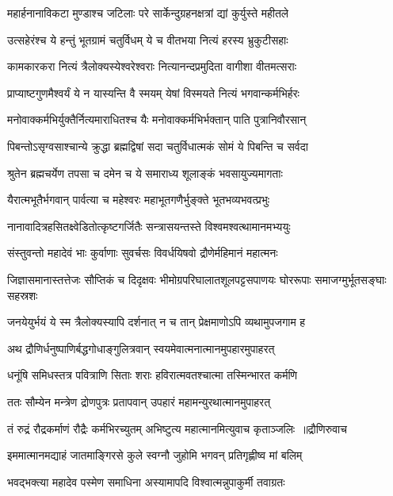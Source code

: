 \twolineshloka
{महार्हनानाविकटा मुण्डाश्च जटिलाः परे}
{सार्केन्दुग्रहनक्षत्रां द्यां कुर्युस्ते महीतले}


\twolineshloka
{उत्सहेरंश्च ये हन्तुं भूतग्रामं चतुर्विधम्}
{ये च वीतभया नित्यं हरस्य भ्रुकुटीसहाः}


\twolineshloka
{कामकारकरा नित्यं त्रैलोक्यस्येश्वरेश्वराः}
{नित्यानन्दप्रमुदिता वागीशा वीतमत्सराः}


\twolineshloka
{प्राप्याष्टगुणमैश्वर्यं ये न यास्यन्ति वै स्मयम्}
{येषां विस्मयते नित्यं भगवान्कर्मभिर्हरः}


\twolineshloka
{मनोवाक्कर्मभिर्युक्तैर्नित्यमाराधितश्च यैः}
{मनोवाक्कर्मभिर्भक्तान् पाति पुत्रानिवौरसान्}


\twolineshloka
{पिबन्तोऽसृग्वसाश्चान्ये क्रुद्धा ब्रह्मद्विषां सदा}
{चतुर्विधात्मकं सोमं ये पिबन्ति च सर्वदा}


\twolineshloka
{श्रुतेन ब्रह्मचर्येण तपसा च दमेन च}
{ये समाराध्य शूलाङ्कं भवसायुज्यमागताः}


\twolineshloka
{यैरात्मभूतैर्भगवान् पार्वत्या च महेश्वरः}
{महाभूतगणैर्भुङ्क्ते भूतभव्यभवत्प्रभुः}


\twolineshloka
{नानावादित्रहसितक्ष्वेडितोत्कृष्टगर्जितैः}
{सन्त्रासयन्तस्ते विश्वमश्वत्थामानमभ्ययुः}


\twolineshloka
{संस्तुवन्तो महादेवं भाः कुर्वाणाः सुवर्चसः}
{विवर्धयिषवो द्रौणेर्महिमानं महात्मनः}


\threelineshloka
{जिज्ञासमानास्तत्तेजः सौप्तिकं च दिदृक्षवः}
{भीमोग्रपरिघालातशूलपट्टसपाणयः}
{घोररूपाः समाजग्मुर्भूतसङ्घाः सहस्रशः}


\twolineshloka
{जनयेयुर्भयं ये स्म त्रैलोक्यस्यापि दर्शनात्}
{न च तान् प्रेक्षमाणोऽपि व्यथामुपजगाम ह}


\twolineshloka
{अथ द्रौणिर्धनुष्पाणिर्बद्धगोधाङ्गुलित्रवान्}
{स्वयमेवात्मनात्मानमुपहारमुपाहरत्}


\twolineshloka
{धनूंषि समिधस्तत्र पवित्राणि सिताः शराः}
{हविरात्मवतश्चात्मा तस्मिन्भारत कर्मणि}


\twolineshloka
{ततः सौम्येन मन्त्रेण द्रोणपुत्रः प्रतापवान्}
{उपहारं महामन्युरथात्मानमुपाहरत्}


\threelineshloka
{तं रुद्रं रौद्रकर्माणं रौद्रैः कर्मभिरच्युतम्}
{अभिष्टुत्य महात्मानमित्युवाच कृताञ्जलिः ॥द्रौणिरुवाच}
{}


\twolineshloka
{इममात्मानमद्याहं जातमाङ्गिरसे कुले}
{स्वग्नौ जुहोमि भगवन् प्रतिगृह्णीष्व मां बलिम्}


\twolineshloka
{भवद्भक्त्या महादेव पस्मेण समाधिना}
{अस्यामापदि विश्वात्मन्नुपाकुर्मी तवाग्रतः}


